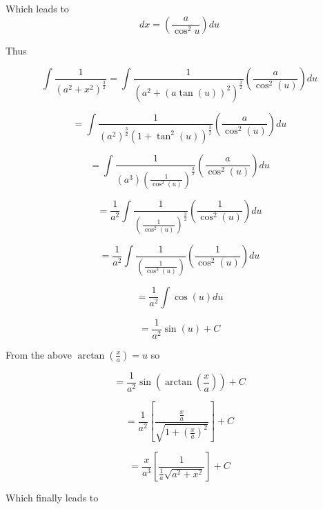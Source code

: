 \documentclass[14pt]{memoir}
\begin{document}
Which leads to 
\begin{equation}
dx = ( \frac{a}{\cos^2{u}}) du 
\end{equation}

Thus

\begin{equation}
\int \frac{1}{(a^2 + x^2)^{\frac{3}{2}}} =  \int \frac{1}{(a^2 + (a\tan{(u)})^2)^{\frac{3}{2}}} ( \frac{a}{\cos^2{(u)}}) du
\end{equation}

\begin{equation}
=  \int \frac{1}{(a^2)^{\frac{3}{2}} (1 + \tan^2{(u)})^{\frac{3}{2}}} ( \frac{a}{\cos^2{(u)}}) du
\end{equation}

\begin{equation}
=  \int \frac{1}{(a^3)(\frac{1}{\cos^2(u)})^{\frac{3}{2}}} ( \frac{a}{\cos^2{(u)}}) du
\end{equation}

\begin{equation}
=  \frac{1}{a^2} \int \frac{1}{(\frac{1}{\cos^2(u)})^{\frac{3}{2}}} ( \frac{1}{\cos^2{(u)}}) du
\end{equation}

\begin{equation}
=  \frac{1}{a^2} \int \frac{1}{(\frac{1}{\cos^3(u)})} ( \frac{1}{\cos^2{(u)}}) du
\end{equation}

\begin{equation}
=  \frac{1}{a^2} \int \cos{(u)} du
\end{equation}

\begin{equation}
=  \frac{1}{a^2} \sin{(u)} + C
\end{equation}


From the above $\arctan{(\frac{x}{a})} = u$ so

\begin{equation}
=  \frac{1}{a^2} \sin{(\arctan{(\frac{x}{a})})} + C
\end{equation}

\begin{equation}
=  \frac{1}{a^2} [\frac{\frac{x}{a}}{\sqrt{1+(\frac{x}{a})^2}}] + C
\end{equation}

\begin{equation}
=  \frac{x}{a^3} [\frac{1}{\frac{1}{a} \sqrt{a^2+x^2}}] + C
\end{equation}

Which finally leads to
\end{document}
